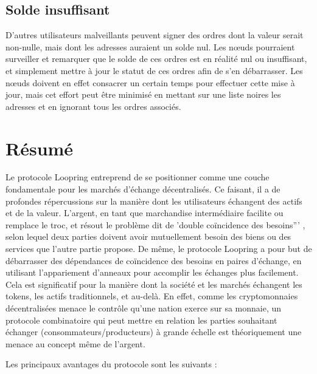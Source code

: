 \documentclass[UTF8,nofonts]{article}
\begin{document}
\begin{multicols}{2}
\subsection{Solde insuffisant}
D'autres utilisateurs malveillants peuvent signer des ordres dont la valeur serait non-nulle, mais dont les adresses auraient un solde nul. Les nœuds pourraient surveiller et remarquer que le solde de ces ordres est en réalité nul ou insuffisant, et simplement mettre à jour le statut de ces ordres afin de s'en débarrasser. Les nœuds doivent en effet consacrer un certain temps pour effectuer cette mise à jour, mais cet effort peut être minimisé en mettant sur une liste noires les adresses et en ignorant tous les ordres associés.

\section{Résumé}

Le protocole Loopring entreprend de se positionner comme une couche fondamentale pour les marchés d'échange décentralisés. Ce faisant, il a de profondes répercussions sur la manière dont les utilisateurs échangent des actifs et de la valeur. L'argent, en tant que marchandise intermédiaire facilite ou remplace le troc, et résout le problème dit de 'double coïncidence  des besoins''' \cite{unenumerated2006}, selon lequel deux parties doivent avoir mutuellement besoin des biens ou des services que l'autre partie propose. De même, le protocole Loopring a pour but de débarrasser des dépendances de coïncidence des besoins en paires d'échange, en utilisant l'appariement d'anneaux pour accomplir les échanges plus facilement. Cela est significatif pour la manière dont la société et les marchés échangent les tokens, les actifs traditionnels, et au-delà. En effet, comme les cryptomonnaies décentralisées menace le contrôle qu'une nation exerce sur sa monnaie, un protocole combinatoire qui peut mettre en relation les parties souhaitant échanger (consommateurs/producteurs) à grande échelle est théoriquement une menace au concept même de l'argent. 

Les principaux avantages du protocole sont les suivants :


\end{multicols}
\end{document}
